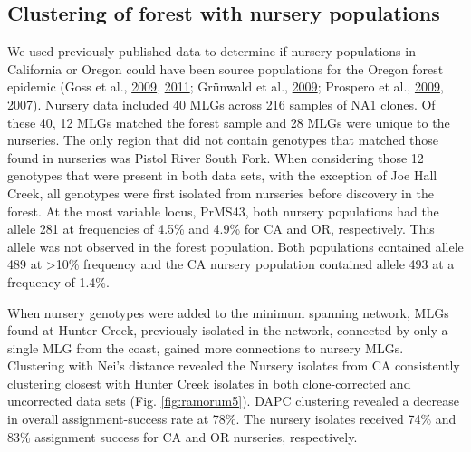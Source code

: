 \documentclass[double,11pt]{beavtex}
\begin{document}
  \newpage
  
  \subsection{Clustering of forest with nursery
  populations}\label{clustering-of-forest-with-nursery-populations}
  
  We used previously published data to determine if nursery populations in
  California or Oregon could have been source populations for the Oregon
  forest epidemic (Goss et al.,
  \protect\hyperlink{ref-goss2009population}{2009},
  \protect\hyperlink{ref-goss2011phytophthora}{2011}; Grünwald et al.,
  \protect\hyperlink{ref-grunwald2009standardizing}{2009}; Prospero et
  al., \protect\hyperlink{ref-prospero2009migration}{2009},
  \protect\hyperlink{ref-prospero2007population}{2007}). Nursery data
  included 40 MLGs across 216 samples of NA1 clones. Of these 40, 12 MLGs
  matched the forest sample and 28 MLGs were unique to the nurseries. The
  only region that did not contain genotypes that matched those found in
  nurseries was Pistol River South Fork. When considering those 12
  genotypes that were present in both data sets, with the exception of Joe
  Hall Creek, all genotypes were first isolated from nurseries before
  discovery in the forest. At the most variable locus, PrMS43, both
  nursery populations had the allele 281 at frequencies of 4.5\% and 4.9\%
  for CA and OR, respectively. This allele was not observed in the forest
  population. Both populations contained allele 489 at \textgreater{}10\%
  frequency and the CA nursery population contained allele 493 at a
  frequency of 1.4\%.
  
  When nursery genotypes were added to the minimum spanning network, MLGs
  found at Hunter Creek, previously isolated in the network, connected by
  only a single MLG from the coast, gained more connections to nursery
  MLGs. Clustering with Nei's distance revealed the Nursery isolates from
  CA consistently clustering closest with Hunter Creek isolates in both
  clone-corrected and uncorrected data sets (Fig. \ref{fig:ramorum5}).
  DAPC clustering revealed a decrease in overall assignment-success rate
  at 78\%. The nursery isolates received 74\% and 83\% assignment success
  for CA and OR nurseries, respectively.
  
\end{document}
